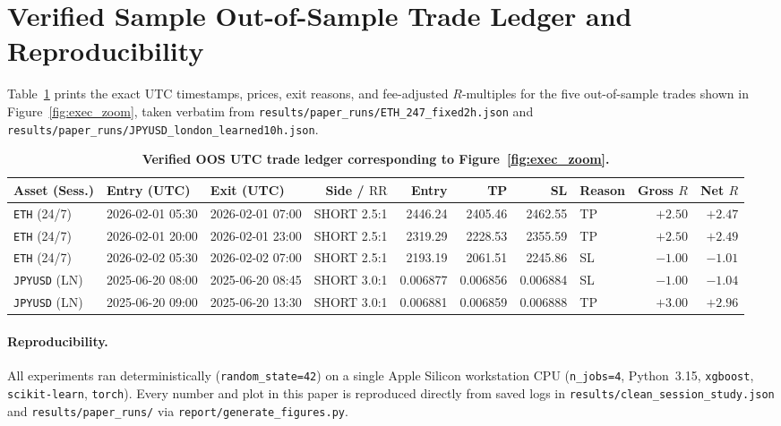\documentclass{article}
\newcommand{\RR}{\mathrm{RR}}
\begin{document}
\section{Verified Sample Out-of-Sample Trade Ledger and Reproducibility}
\label{app:ledger}

Table~\ref{tab:app_ledger} prints the exact UTC timestamps, prices, exit reasons, and fee-adjusted $R$-multiples for the five out-of-sample trades shown in Figure~\ref{fig:exec_zoom}, taken verbatim from \texttt{results/paper\_runs/ETH\_247\_fixed2h.json} and \texttt{results/paper\_runs/JPYUSD\_london\_learned10h.json}.

\begin{table}[h]
  \centering
  \caption{\textbf{Verified OOS UTC trade ledger corresponding to Figure~\ref{fig:exec_zoom}.}}
  \label{tab:app_ledger}
  \scriptsize
  \setlength{\tabcolsep}{3.4pt}
  \begin{tabular}{@{}lllrrrrlrr@{}}
    \toprule
    Asset (Sess.) & Entry (UTC) & Exit (UTC) & Side / $\RR$ & Entry & TP & SL & Reason & Gross $R$ & Net $R$ \\
    \midrule
    \texttt{ETH} (24/7) & 2026-02-01 05:30 & 2026-02-01 07:00 & SHORT 2.5:1 & 2446.24 & 2405.46 & 2462.55 & TP & $+2.50$ & $+2.47$ \\
    \texttt{ETH} (24/7) & 2026-02-01 20:00 & 2026-02-01 23:00 & SHORT 2.5:1 & 2319.29 & 2228.53 & 2355.59 & TP & $+2.50$ & $+2.49$ \\
    \texttt{ETH} (24/7) & 2026-02-02 05:30 & 2026-02-02 07:00 & SHORT 2.5:1 & 2193.19 & 2061.51 & 2245.86 & SL & $-1.00$ & $-1.01$ \\
    \midrule
    \texttt{JPYUSD} (LN) & 2025-06-20 08:00 & 2025-06-20 08:45 & SHORT 3.0:1 & 0.006877 & 0.006856 & 0.006884 & SL & $-1.00$ & $-1.04$ \\
    \texttt{JPYUSD} (LN) & 2025-06-20 09:00 & 2025-06-20 13:30 & SHORT 3.0:1 & 0.006881 & 0.006859 & 0.006888 & TP & $+3.00$ & $+2.96$ \\
    \bottomrule
  \end{tabular}
\end{table}

\paragraph{Reproducibility.}
All experiments ran deterministically (\texttt{random\_state=42}) on a single Apple Silicon workstation CPU (\texttt{n\_jobs=4}, Python~3.15, \texttt{xgboost}, \texttt{scikit-learn}, \texttt{torch}). Every number and plot in this paper is reproduced directly from saved logs in \texttt{results/clean\_session\_study.json} and \texttt{results/paper\_runs/} via \texttt{report/generate\_figures.py}.
\end{document}
